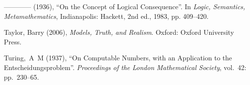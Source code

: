 \documentclass[openany,leqno,11pt,draft]{book}
\theoremstyle{break}
\theoremstyle{definition}
\theoremstyle{remark}
\begin{document}
{\begin{thebibliography}{39}
---\!\!---\!\!---\!\!--- (1936), \enquote{On the Concept of Logical Consequence}. 
  In \emph{Logic, Semantics, Metamathematics}, Indianapolis: Hackett, 2nd ed., 1983, pp. 409–420.



Taylor, Barry (2006), \emph{Models, Truth, and Realism}. Oxford: Oxford
  University Press.

Turing,~A~M (1937), \enquote{On Computable Numbers, with an Application to
  the Entscheidungsproblem}. \emph{Proceedings of the London Mathematical
  Society}, vol.~42: pp.~230–65.

\end{thebibliography}
}






	
\end{document}
